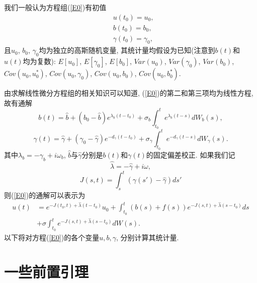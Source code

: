 \documentclass[notitlepage,cs4size,punct,oneside]{ctexrep}
\numberwithin{equation}{section}
\theoremstyle{mystyle}
\begin{document}
我们一般认为方程组(\ref{E0})有初值
\begin{equation} \label{init_values}
\begin{split}
& u(t_0) = u_0, \\
& b(t_0) = b_0, \\
& \gamma(t_0) = \gamma_0,
\end{split}
\end{equation}
且$u_0$, $b_0$, $\gamma_0$均为独立的高斯随机变量, 其统计量均假设为已知(注意到$b(t)$和$u(t)$均为复数):
$E[u_0]$, $E[\gamma_0]$, $E[b_0]$, $Var(u_0)$, $Var(\gamma_0)$, $Var(b_0)$, $Cov(u_0, u_0^*)$, $Cov(u_0, \gamma_0)$, $Cov(u_0, b_0)$, $Cov(u_0, b_0^*)$.

由求解线性微分方程组的相关知识\cite{fulinjin1984ordinary}可以知道, (\ref{E0})的第二和第三项均为线性方程, 故有通解
\begin{equation} \label{Sb}
b(t) = \hat{b}+(b_0-\hat{b})e^{\lambda_b(t-t_0)}+\sigma_b\int_{t_0}^t e^{\lambda_b(t-s)}dW_b(s),
\end{equation}
\begin{equation} \label{Sg}
\gamma(t) = \hat{\gamma}+(\gamma_0-\hat{\gamma})e^{-d_{\gamma}(t-t_0)}+\sigma_{\gamma}\int_{t_0}^t e^{-d_{\gamma}(t-s)}dW_{\gamma}(s).
\end{equation}
其中$\lambda_b = -\gamma_b+i\omega_b$, $\hat{b}$与$\hat{\gamma}$分别是$b(t)$和$\gamma(t)$的固定偏差校正.
如果我们记
\begin{equation}
\hat{\lambda} = -\hat{\gamma}+i\omega,
\end{equation}
\begin{equation} \label{def J(s, t)}
J(s, t) = \int_s^t (\gamma(s')-\hat{\gamma})ds'
\end{equation}
则(\ref{E0})的通解可以表示为
\begin{equation} \label{Su}
\begin{split}
u(t) &= e^{-J(t_0, t)+\hat{\lambda}(t-t_0)}u_0 + \int_{t_0}^t (b(s)+f(s))e^{-J(s, t)+\hat{\lambda}(s-t_0)}ds \\
& + \sigma\int_{t_0}^{t}e^{-J(s, t)+\hat{\lambda}(s-t_0)}dW(s).
\end{split}
\end{equation}
以下将对方程(\ref{E0})的各个变量$u, b, \gamma$, 分别计算其统计量.

\section{一些前置引理}
\end{document}

